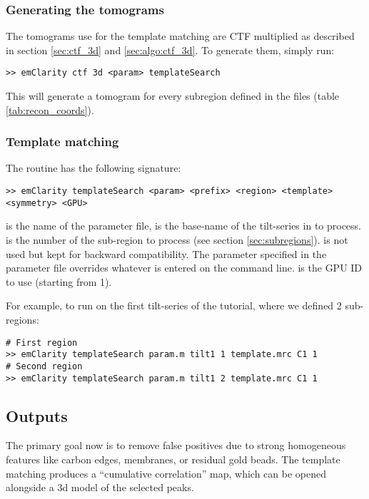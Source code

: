 \subsubsection{Generating the tomograms}

The tomograms use for the template matching are CTF multiplied as described in section \ref{sec:ctf_3d} and \ref{sec:algo:ctf_3d}. To generate them, simply run:
\begin{lstlisting}
>> emClarity ctf 3d <param> templateSearch
\end{lstlisting}
This will generate a tomogram for every subregion defined in the  files (table \ref{tab:recon_coords}).

\subsubsection{Template matching}

The  routine has the following signature:
\begin{lstlisting}
>> emClarity templateSearch <param> <prefix> <region> <template> <symmetry> <GPU>
\end{lstlisting}
 is the name of the parameter file,  is the base-name of the tilt-series in  to process.  is the number of the sub-region to process (see section \ref{sec:subregions}).  is not used but kept for backward compatibility. The  parameter specified in the parameter file overrides whatever is entered on the command line.  is the GPU ID to use (starting from 1).

For example, to run  on the first tilt-series of the tutorial, where we defined 2 sub-regions:
\begin{lstlisting}
# First region
>> emClarity templateSearch param.m tilt1 1 template.mrc C1 1
# Second region
>> emClarity templateSearch param.m tilt1 2 template.mrc C1 1
\end{lstlisting}

\subsection{Outputs}

The primary goal now is to remove false positives due to strong homogeneous features like carbon edges, membranes, or residual gold beads. The template matching produces a ``cumulative correlation'' map, which can be opened alongside a 3d model of the selected peaks.

